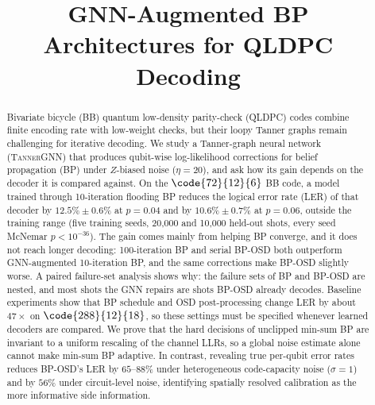 
\title{GNN-Augmented BP Architectures for QLDPC Decoding}

\begin{abstract}
Bivariate bicycle (BB) quantum low-density parity-check (QLDPC) codes
combine finite encoding rate with low-weight checks, but their loopy
Tanner graphs remain challenging for iterative decoding. We study a
Tanner-graph neural network (\textsc{TannerGNN}) that produces
qubit-wise log-likelihood corrections for belief propagation (BP) under
$Z$-biased noise ($\eta=20$), and ask how its gain depends on the decoder
it is compared against. On the $\code{72}{12}{6}$ BB code, a model trained
through 10-iteration flooding BP reduces the logical error rate (LER) of
that decoder by $12.5\%\pm0.6\%$ at $p=0.04$ and by $10.6\%\pm0.7\%$ at
$p=0.06$, outside the training range (five training seeds, 20{,}000 and
10{,}000 held-out shots, every seed McNemar $p<10^{-36}$). The gain comes
mainly from helping BP converge, and it does not reach longer decoding:
100-iteration BP and serial BP-OSD both outperform GNN-augmented
10-iteration BP, and the same corrections make BP-OSD slightly worse. A
paired failure-set analysis shows why: the failure sets of BP and BP-OSD
are nested, and most shots the GNN repairs are shots BP-OSD already
decodes. Baseline experiments show that BP schedule and OSD
post-processing change LER by about $47\times$ on
$\code{288}{12}{18}$, so these settings must be specified whenever
learned decoders are compared. We prove that the hard decisions of
unclipped min-sum BP are invariant to a uniform rescaling of the channel
LLRs, so a global noise estimate alone cannot make min-sum BP adaptive.
In contrast, revealing true per-qubit error rates reduces BP-OSD's LER by
$65$--$88\%$ under heterogeneous code-capacity noise ($\sigma=1$) and by
$56\%$ under circuit-level noise, identifying spatially resolved
calibration as the more informative side information.
\end{abstract}

